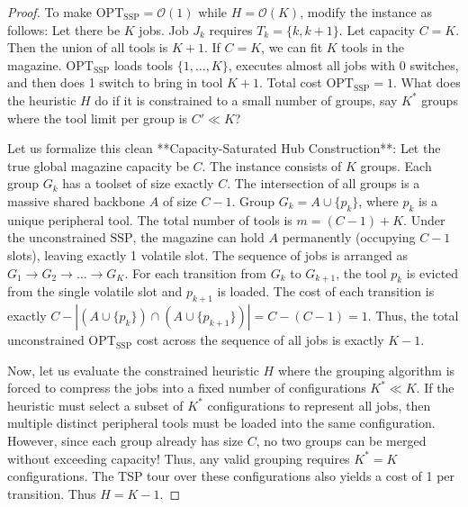 \documentclass[11pt,a4paper]{article}
\theoremstyle{plain}
\theoremstyle{definition}
\newcommand{\OPT}{\text{OPT}}
\newcommand{\SSP}{\text{SSP}}
\begin{document}
\begin{proof}
	To make $\OPT_{\SSP} = \mathcal{O}(1)$ while $H = \mathcal{O}(K)$, modify the instance as follows:
	Let there be $K$ jobs. Job $J_k$ requires $T_k = \{k, k+1\}$. Let capacity $C = K$.
	Then the union of all tools is $K+1$. If $C=K$, we can fit $K$ tools in the magazine. 
	$\OPT_{\SSP}$ loads tools $\{1, \dots, K\}$, executes almost all jobs with 0 switches, and then does 1 switch to bring in tool $K+1$. Total cost $\OPT_{\SSP} = 1$.
	What does the heuristic $H$ do if it is constrained to a small number of groups, say $K^*$ groups where the tool limit per group is $C' \ll K$? 
	
	Let us formalize this clean **Capacity-Saturated Hub Construction**:
	Let the true global magazine capacity be $C$. 
	The instance consists of $K$ groups. Each group $G_k$ has a toolset of size exactly $C$. 
	The intersection of all groups is a massive shared backbone $A$ of size $C-1$. 
	Group $G_k = A \cup \{p_k\}$, where $p_k$ is a unique peripheral tool.
	The total number of tools is $m = (C-1) + K$.
	Under the unconstrained $\SSP$, the magazine can hold $A$ permanently (occupying $C-1$ slots), leaving exactly 1 volatile slot. 
	The sequence of jobs is arranged as $G_1 \to G_2 \to \dots \to G_K$. 
	For each transition from $G_k$ to $G_{k+1}$, the tool $p_k$ is evicted from the single volatile slot and $p_{k+1}$ is loaded.
	The cost of each transition is exactly $C - |(A \cup \{p_k\}) \cap (A \cup \{p_{k+1}\})| = C - (C-1) = 1$.
	Thus, the total unconstrained $\OPT_{\SSP}$ cost across the sequence of all jobs is exactly $K-1$.
	
	Now, let us evaluate the constrained heuristic $H$ where the grouping algorithm is forced to compress the jobs into a fixed number of configurations $K^* \ll K$. If the heuristic must select a subset of $K^*$ configurations to represent all jobs, then multiple distinct peripheral tools must be loaded into the same configuration. However, since each group already has size $C$, no two groups can be merged without exceeding capacity! Thus, any valid grouping requires $K^* = K$ configurations. The TSP tour over these configurations also yields a cost of 1 per transition. Thus $H = K-1$.
	

\end{proof}
\end{document}
